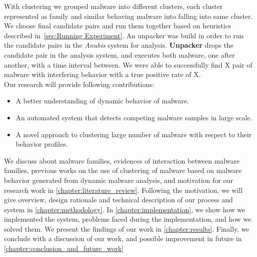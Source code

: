 With clustering we grouped malware into different clusters, each cluster represented as family and similar behaving malware into falling into same cluster.
We choose final candidate pairs and run them together based on heuristics described in~\autoref{sec:Running Experiment}.
An unpacker was build in order to run the candidate pairs in the \emph{Anubis} system for analysis.
\textbf{Unpacker} drops the candidate pair in the analysis system, and executes both malware, one after another, with a time interval between.
We were able to successfully find X pair of malware with interfering behavior with a true positive rate of X.\\
Our research will provide following contributions:
\begin{itemize}
  \item A better understanding of dynamic behavior of malware.
  \item An automated system that detects competing malware samples in large scale.
  \item A novel approach to clustering large number of malware with respect to their behavior profiles.
\end{itemize}
We discuss about malware families, evidences of interaction between malware families, previous works on the use of clustering of malware based on malware behavior generated from dynamic malware analysis, and motivation for our research work in \autoref{chapter:literature_review}.
Following the motivation, we will give overview, design rationale and technical description of our process and system in \autoref{chapter:methodology}.
In \autoref{chapter:implementation}, we show how we implemented the system, problems faced during the implementation, and how we solved them.
We present the findings of our work in \autoref{chapter:results}.
Finally, we conclude with a discussion of our work, and possible improvement in future in \autoref{chapter:conclusion_and_future_work}
